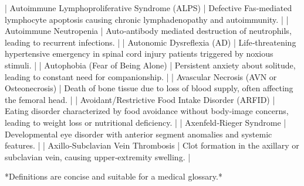 | Autoimmune Lymphoproliferative Syndrome (ALPS) | Defective Fas‑mediated lymphocyte apoptosis causing chronic lymphadenopathy and autoimmunity. |
| Autoimmune Neutropenia | Auto‑antibody mediated destruction of neutrophils, leading to recurrent infections. |
| Autonomic Dysreflexia (AD) | Life‑threatening hypertensive emergency in spinal cord injury patients triggered by noxious stimuli. |
| Autophobia (Fear of Being Alone) | Persistent anxiety about solitude, leading to constant need for companionship. |
| Avascular Necrosis (AVN or Osteonecrosis) | Death of bone tissue due to loss of blood supply, often affecting the femoral head. |
| Avoidant/Restrictive Food Intake Disorder (ARFID) | Eating disorder characterized by food avoidance without body‑image concerns, leading to weight loss or nutritional deficiency. |
| Axenfeld‑Rieger Syndrome | Developmental eye disorder with anterior segment anomalies and systemic features. |
| Axillo‑Subclavian Vein Thrombosis | Clot formation in the axillary or subclavian vein, causing upper‑extremity swelling. |

*Definitions are concise and suitable for a medical glossary.*
